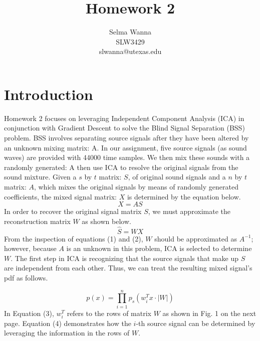 \documentclass[12pt]{article}
\begin{document}
 
 
\title{Homework 2}
\author{Selma Wanna \\ SLW3429 \\ slwanna@utexas.edu} 
\maketitle
 
\section{Introduction}

Homework 2 focuses on leveraging Independent Component Analysis (ICA) in conjunction with Gradient Descent to solve the Blind Signal Separation (BSS) problem.
\bigbreak
\noindent
BSS involves separating source signals after they have been altered by an unknown mixing matrix: A. In our assignment, five source signals (as sound waves) are provided with 44000 time samples. We then mix these sounds with a randomly generated: A then use ICA to resolve the original signals from the sound mixture.  
\bigbreak
\noindent
Given a \(s\) by \(t\) matrix: \(S\), of original sound signals and a \(n\) by \(t\) matrix: \(A\), which mixes the original signals by means of randomly generated coefficients, the mixed signal matrix: \(X\) is determined by the equation below. 
\begin{equation}
    X = AS
\end{equation}
\bigbreak
\noindent
In order to recover the original signal matrix \(S\), we must approximate the reconstruction matrix \(W\) as shown below.
\begin{equation}
    \hat{S}=WX
\end{equation}
From the inspection of equations (1) and (2), \(W\) should be approximated as \(A^{-1}\); however, because \(A\) is an unknown in this problem, ICA is selected to determine \(W\). 
\bigbreak
\noindent
The first step in ICA is recognizing that the source signals that make up \(S\) are independent from each other. Thus, we can treat the resulting mixed signal's pdf as follows.

\begin{equation}
    p(x)=\prod_{i=1}^{n}p_{s}(w_{i}^{T}x\cdot \left | W \right |)
\end{equation}
\bigbreak
\noindent
In Equation (3), \(w_{i}^{T}\) refers to the rows of matrix \(W\) as shown in Fig. 1 on the next page. Equation (4) demonstrates how the \(i\)-th source signal can be determined by leveraging the information in the rows of \(W\). 
\end{document}
